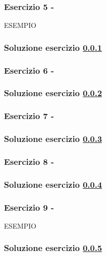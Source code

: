 \documentclass[../main.tex]{subfiles}
\begin{document}
\vspace*{1.5cm}
\subsubsection{Esercizio 5 - }
\label{e2e5}

ESEMPIO

\subsubsection*{Soluzione esercizio \ref{e2e5}}

\vspace*{1.5cm}
\subsubsection{Esercizio 6 - }
\label{e2e6}

\subsubsection*{Soluzione esercizio \ref{e2e6}}

\vspace*{1.5cm}
\subsubsection{Esercizio 7 - }
\label{e2e7}

\subsubsection*{Soluzione esercizio \ref{e2e7}}

\vspace*{1.5cm}
\subsubsection{Esercizio 8 - }
\label{e2e8}

\subsubsection*{Soluzione esercizio \ref{e2e8}}

\vspace*{1.5cm}
\subsubsection{Esercizio 9 - }
\label{e2e9}

ESEMPIO

\subsubsection*{Soluzione esercizio \ref{e2e9}}
\end{document}
